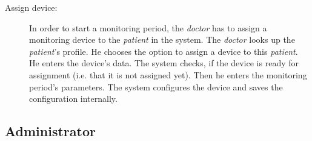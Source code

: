 \documentclass[fontsize=12pt,
               paper=a4,
               twoside=false,
               parskip=half,
               ]{scrartcl}
\begin{document}
\begin{description}

\item[Assign device:] In order to start a monitoring period, the \emph{doctor} has to assign a monitoring device to the \emph{patient} in the system. The \emph{doctor} looks up the \emph{patient}'s profile. He chooses the option to assign a device to this \emph{patient}. He enters the device's data. The system checks, if the device is ready for assignment (i.e. that it is not assigned yet). Then he enters the monitoring period's parameters. The system configures the device and saves the configuration internally.





\end{description}

\subsection{Administrator}
\end{document}
